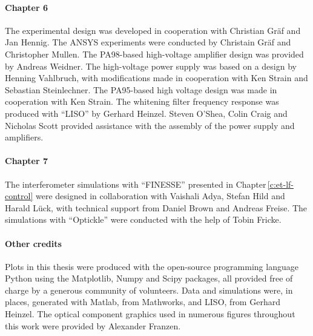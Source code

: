 \paragraph{Chapter 6}
The experimental design was developed in cooperation with Christian Gr\"{a}f and Jan Hennig. The ANSYS experiments were conducted by Christain Gr\"{a}f and Christopher Mullen. The PA98-based high-voltage amplifier design was provided by Andreas Weidner. The high-voltage power supply was based on a design by Henning Vahlbruch, with modifications made in cooperation with Ken Strain and Sebastian Steinlechner. The PA95-based high voltage design was made in cooperation with Ken Strain. The whitening filter frequency response was produced with ``LISO'' by Gerhard Heinzel. Steven O'Shea, Colin Craig and Nicholas Scott provided assistance with the assembly of the power supply and amplifiers.

\paragraph{Chapter 7}
The interferometer simulations with ``FINESSE'' presented in Chapter\,\ref{c:et-lf-control} were designed in collaboration with Vaishali Adya, Stefan Hild and Harald L\"{u}ck, with technical support from Daniel Brown and Andreas Freise. The simulations with ``Optickle'' were conducted with the help of Tobin Fricke.

\paragraph{Other credits}
Plots in this thesis were produced with the open-source programming language Python using the Matplotlib, Numpy and Scipy packages, all provided free of charge by a generous community of volunteers. Data and simulations were, in places, generated with Matlab, from Mathworks, and LISO, from Gerhard Heinzel. The optical component graphics used in numerous figures throughout this work were provided by Alexander Franzen.